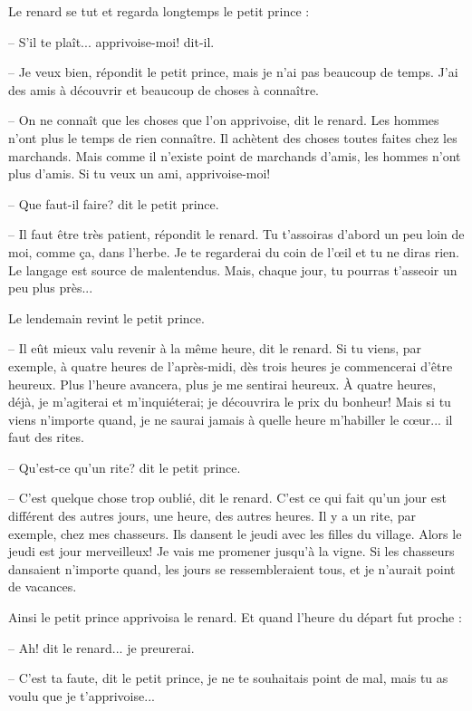 \documentclass[a4paper]{report}
\begin{document}
Le renard se tut et regarda longtemps le petit prince :

-- S'il te plaît... apprivoise-moi! dit-il.

-- Je veux bien, répondit le petit prince, mais je n'ai pas beaucoup de temps. J'ai des amis à découvrir et beaucoup de choses à connaître.

-- On ne connaît que les choses que l'on apprivoise, dit le renard. Les hommes n'ont plus le temps de rien connaître. Il achètent des choses toutes faites chez les marchands. Mais comme il n'existe point de marchands d'amis, les hommes n'ont plus d'amis. Si tu veux un ami, apprivoise-moi!

-- Que faut-il faire? dit le petit prince.

-- Il faut être très patient, répondit le renard. Tu t'assoiras d'abord un peu loin de moi, comme ça, dans l'herbe. Je te regarderai du coin de l'œil et tu ne diras rien. Le langage est source de malentendus. Mais, chaque jour, tu pourras t'asseoir un peu plus près...

Le lendemain revint le petit prince.

-- Il eût mieux valu revenir à la même heure, dit le renard. Si tu viens, par exemple, à quatre heures de l'après-midi, dès trois heures je commencerai d'être heureux. Plus l'heure avancera, plus je me sentirai heureux. À quatre heures, déjà, je m'agiterai et m'inquiéterai; je découvrira le prix du bonheur! Mais si tu viens n'importe quand, je ne saurai jamais à quelle heure m'habiller le cœur... il faut des rites.

-- Qu'est-ce qu'un rite? dit le petit prince.

-- C'est quelque chose trop oublié, dit le renard. C'est ce qui fait qu'un jour est différent des autres jours, une heure, des autres heures. Il y a un rite, par exemple, chez mes chasseurs. Ils dansent le jeudi avec les filles du village. Alors le jeudi est jour merveilleux! Je vais me promener jusqu'à la vigne. Si les chasseurs dansaient n'importe quand, les jours se ressembleraient tous, et je n'aurait point de vacances.


Ainsi le petit prince apprivoisa le renard. Et quand l'heure du départ fut proche :

-- Ah! dit le renard... je preurerai.

-- C'est ta faute, dit le petit prince, je ne te souhaitais point de mal, mais tu as voulu que je t'apprivoise...
\end{document}
